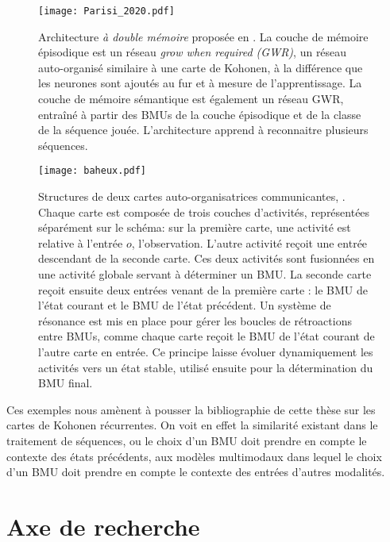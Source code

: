 \documentclass[../main]{subfiles}
\begin{document}
\begin{figure}
    \centering
    \texttt{[image: Parisi\_2020.pdf]}
    \caption{Architecture \emph{à double mémoire} proposée en \cite{parisiLL}. La couche de mémoire épisodique est un réseau \emph{grow when required (GWR)}, un réseau auto-organisé similaire à une carte de Kohonen, à la différence que les neurones sont ajoutés au fur et à mesure de l'apprentissage. La couche de mémoire sémantique est également un réseau GWR, entraîné à partir des BMUs de la couche épisodique et de la classe de la séquence jouée. L'architecture apprend à reconnaitre plusieurs séquences.\label{fig:gdm_parisi}}
\end{figure}

\begin{figure}
    \centering
    \texttt{[image: baheux.pdf]}
    \caption{Structures de deux cartes auto-organisatrices communicantes, \cite{baheux_towards_2014}. Chaque carte est composée de trois couches d'activités, représentées séparément sur le schéma: sur la première carte, une activité est relative à l'entrée $o$, l'observation. L'autre activité reçoit une entrée descendant de la seconde carte. Ces deux activités sont fusionnées en une activité globale servant à déterminer un BMU. La seconde carte reçoit ensuite deux entrées venant de la première carte : le BMU de l'état courant et le BMU de l'état précédent. Un système de résonance est mis en place pour gérer les boucles de rétroactions entre BMUs, comme chaque carte reçoit le BMU de l'état courant de l'autre carte en entrée. Ce principe laisse évoluer dynamiquement les activités vers un état stable, utilisé ensuite pour la détermination du BMU final.\label{fig:baheux}}
\end{figure}

Ces exemples nous amènent à pousser la bibliographie de cette thèse sur les cartes de Kohonen récurrentes. On voit en effet la similarité existant dans le traitement de séquences, ou le choix d'un BMU doit prendre en compte le contexte des états précédents, aux modèles multimodaux dans lequel le choix d'un BMU doit prendre en compte le contexte des entrées d'autres modalités. 



\section{Axe de recherche}
\end{document}
